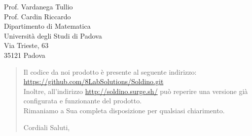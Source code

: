 \begin{letter}{
		Prof. Vardanega Tullio \\
		Prof. Cardin Riccardo \\
		Dipartimento di Matematica \\
		Università degli Studi di Padova \\
		Via Trieste, 63 \\
		35121 Padova}
\begin{quotation}
\noindent Il codice da noi prodotto è presente al seguente indirizzo:\\
\url{https://github.com/8LabSolutions/Soldino.git}\\
Inoltre, all'indirizzo \url{http://soldino.surge.sh/} 
può reperire una
versione già configurata e funzionante del prodotto.\\
Rimaniamo a Sua completa disposizione per qualsiasi chiarimento.

\vspace{0.5cm}
\noindent Cordiali Saluti,
\closing{}	

\end{quotation}
		
\end{letter}

